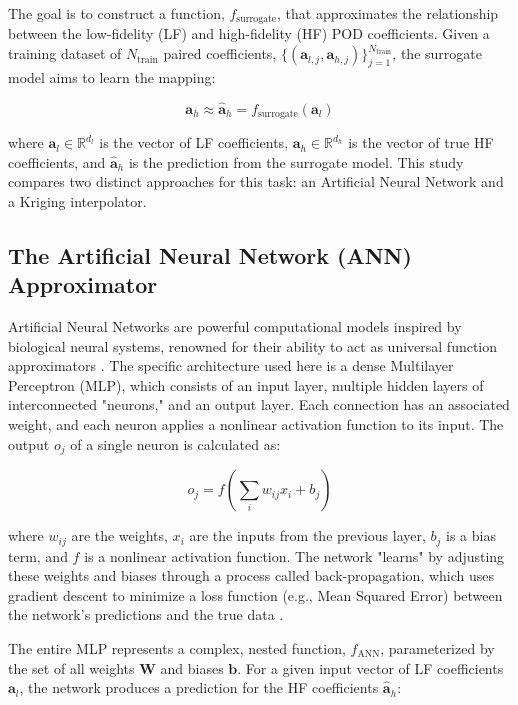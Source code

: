 \documentclass[tg, EN]{ufabcFHZh_tg}
\begin{document}
The goal is to construct a function, $f_{\text{surrogate}}$, that approximates the relationship between the low-fidelity (LF) and high-fidelity (HF) POD coefficients. Given a training dataset of $N_{\text{train}}$ paired coefficients, $\{ (\mathbf{a}_{l,j}, \mathbf{a}_{h,j}) \}_{j=1}^{N_{\text{train}}}$, the surrogate model aims to learn the mapping:

\begin{equation}
    \mathbf{a}_h \approx \hat{\mathbf{a}}_h = f_{\text{surrogate}}(\mathbf{a}_l)
    \label{eq:surrogate_mapping}
\end{equation}

where $\mathbf{a}_l \in \mathbb{R}^{d_l}$ is the vector of LF coefficients, $\mathbf{a}_h \in \mathbb{R}^{d_h}$ is the vector of true HF coefficients, and $\hat{\mathbf{a}}_h$ is the prediction from the surrogate model. This study compares two distinct approaches for this task: an Artificial Neural Network and a Kriging interpolator.


\subsection{The Artificial Neural Network (ANN) Approximator}

Artificial Neural Networks are powerful computational models inspired by biological neural systems, renowned for their ability to act as universal function approximators \citep{hornik1989}. The specific architecture used here is a dense Multilayer Perceptron (MLP), which consists of an input layer, multiple hidden layers of interconnected "neurons," and an output layer. Each connection has an associated weight, and each neuron applies a nonlinear activation function to its input. The output $o_j$ of a single neuron is calculated as:

\begin{equation}
o_j = f \left( \sum_{i} w_{ij} x_i + b_j \right)
\end{equation}

where $w_{ij}$ are the weights, $x_i$ are the inputs from the previous layer, $b_j$ is a bias term, and $f$ is a nonlinear activation function. The network "learns" by adjusting these weights and biases through a process called back-propagation, which uses gradient descent to minimize a loss function (e.g., Mean Squared Error) between the network's predictions and the true data \citep{yu2019}.

The entire MLP represents a complex, nested function, $f_{\text{ANN}}$, parameterized by the set of all weights $\mathbf{W}$ and biases $\mathbf{b}$. For a given input vector of LF coefficients $\mathbf{a}_l$, the network produces a prediction for the HF coefficients $\hat{\mathbf{a}}_h$:
\end{document}

